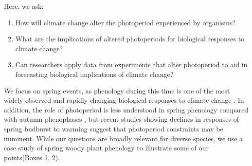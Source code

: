 \documentclass{article}
\begin{document}
\par Here, we ask: 
\begin{enumerate}
\item How will climate change alter the photoperiod experienced by organisms? 
\item What are the implications of altered photoperiods for biological responses to climate change?
\item Can researchers apply data from experiments that alter photoperiod to aid in forecasting biological implications of climate change?

\end{enumerate}
\par We focus on spring events, as phenology during this time is one of the most widely observed and rapidly changing biological responses to climate change \citep{parmesan2006}. In addition, the role of photoperiod is less understood in spring phenology compared with autumn phenophases \citep[reviewed in, e.g.,][]{azeez2015,gallinat2015,lagercrantz2009, allona2008}, but recent studies showing declines in responses of spring budburst to warming \citep[e.g.,][]{fu2019,gusewell2017,yu2010} suggest that photoperiod constraints may be imminent. While our questions are broadly relevant for diverse species, we use a case study of spring woody plant phenology to illustrate some of our points(Boxes 1, 2). 
\end{document}
